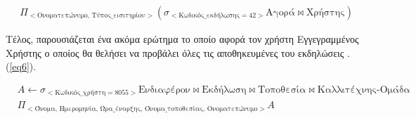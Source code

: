 \begin{equation}
  \label{eq5}
  \begin{split}
    &\Pi_{<\text{Ονοματεπώνυμο, Τύπος\_εισιτηρίου}>}(
    \sigma_{<\text{Κωδικός\_εκδήλωσης} = 42>} \text{Αγορά} \bowtie
    \text{Χρήστης})
  \end{split}
\end{equation}

Τέλος, παρουσιάζεται ένα ακόμα ερώτημα το οποίο αφορά τον χρήστη
Εγγεγραμμένος Χρήστης ο οποίος θα θελήσει να προβάλει όλες τις
αποθηκευμένες του εκδηλώσεις . (\ref{eq6}).


\begin{equation}
  \label{eq6}
  \begin{split}
    &A \leftarrow \sigma_{<\text{Κωδικός\_χρήστη} = 8055>}
    \text{Ενδιαφέρον} \bowtie \text{Εκδήλωση} \bowtie \text{Τοποθεσία}
    \bowtie \text{Καλλιτέχνης-Ομάδα} \\
    &\Pi_{<\text{Όνομα, Ημερομηνία, Ώρα\_έναρξης, Όνομα\_τοποθεσίας,
        Ονοματεπώνυμο}>}A
  \end{split}
\end{equation}










